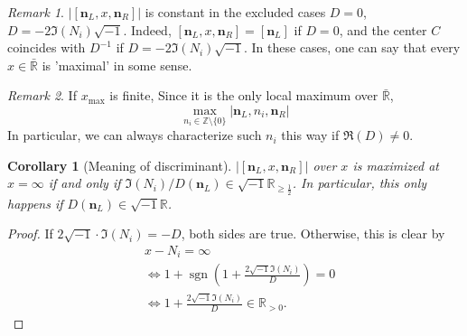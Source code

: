 \documentclass{article}
\theoremstyle{definition}
\theoremstyle{plain}
\newtheorem{corollary}[theorem]{Corollary}
\theoremstyle{remark}
\newtheorem*{remark}{Remark}
\numberwithin{equation}{section}
\newcommand{\bZ}{\mathbb{Z}}
\newcommand{\bR}{\mathbb{R}}
\newcommand{\abs}[1]{\left| {#1} \right|}
\newcommand{\im}{{\sqrt{-1}}}
\DeclareMathOperator{\sgn}{sgn}
\def\nsL{{\mathbf{n}_L}}
\def\nsR{{\mathbf{n}_R}}
\begin{document}
\begin{remark}
  $\abs{[\nsL, x, \nsR]}$ is constant in the excluded cases
  $D = 0$, $D = - 2 \Im(N_i) \im$.
  Indeed, $[\nsL, x, \nsR] = [\nsL]$ if $D = 0$,
  and the center $C$ coincides with $D^{-1}$ if $D = -2 \Im(N_i) \im$.
  In these cases, one can say that every $x \in \bar{\bR}$ is 'maximal' in some sense.
\end{remark}

\begin{remark}
  If $x_{\max}$ is finite,
  Since it is the only local maximum over $\bar{\bR}$,
  \[ \max_{n_i \in \bZ \setminus \{0\}} \abs{\nsL, n_i, \nsR} \]
  In particular, we can always characterize such $n_i$ this way if $\Re(D) \neq 0$.
\end{remark}

\begin{corollary}[Meaning of discriminant]\label{discriminant-meaning}
  $\abs{[\nsL, x, \nsR]}$ over $x$ is maximized at $x = \infty$
  if and only if $\Im(N_i) / D(\nsL) \in \im \bR_{\geq \frac{1}{2}}$.
  In particular, this only happens if $D(\nsL) \in \im \bR$.
\end{corollary}
\begin{proof}
  If $2 \im \cdot \Im(N_i) = -D$, both sides are true.
  Otherwise, this is clear by
  \begin{align*}
    & x - N_i = \infty \\
    & \Leftrightarrow 1 + \sgn(1 + \frac{2 \im \Im(N_i)}{D}) = 0 \\
    & \Leftrightarrow 1 + \frac{2 \im \Im(N_i)}{D} \in \bR_{> 0}.
  \end{align*}
\end{proof}
\end{document}
